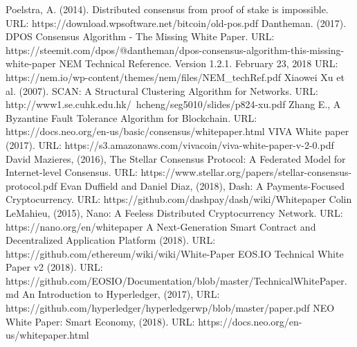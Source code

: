 \documentclass[a4paper,12pt]{article}
\begin{document}
\begin{thebibliography}{99}
  Poelstra, A. (2014). Distributed consensus from proof of stake is impossible. URL: https://download.wpsoftware.net/bitcoin/old-pos.pdf
  Dantheman. (2017). DPOS Consensus Algorithm - The Missing White Paper. URL: https://steemit.com/dpos/@dantheman/dpos-consensus-algorithm-this-missing-white-paper
  NEM Technical Reference. Version 1.2.1. February 23, 2018 URL: https://nem.io/wp-content/themes/nem/files/NEM\_techRef.pdf
 Xiaowei Xu et al. (2007). SCAN: A Structural Clustering Algorithm for Networks. URL: http://www1.se.cuhk.edu.hk/~hcheng/seg5010/slides/p824-xu.pdf
 Zhang E., A Byzantine Fault Tolerance Algorithm for Blockchain. URL: https://docs.neo.org/en-us/basic/consensus/whitepaper.html
 VIVA White paper (2017). URL: https://s3.amazonaws.com/vivacoin/viva-white-paper-v-2-0.pdf
 David Mazieres, (2016), The Stellar Consensus Protocol: A Federated Model for Internet-level Consensus. URL: https://www.stellar.org/papers/stellar-consensus-protocol.pdf
 Evan Duffield and Daniel Diaz, (2018), Dash: A Payments-Focused Cryptocurrency. URL: https://github.com/dashpay/dash/wiki/Whitepaper
 Colin LeMahieu, (2015), Nano: A Feeless Distributed Cryptocurrency Network. URL: https://nano.org/en/whitepaper
 A Next-Generation Smart Contract and Decentralized Application Platform (2018). URL: https://github.com/ethereum/wiki/wiki/White-Paper
 EOS.IO Technical White Paper v2 (2018). URL: https://github.com/EOSIO/Documentation/blob/master/TechnicalWhitePaper.md
 An Introduction to Hyperledger, (2017), URL: https://github.com/hyperledger/hyperledgerwp/blob/master/paper.pdf
 NEO White Paper: Smart Economy, (2018). URL: https://docs.neo.org/en-us/whitepaper.html
\end{thebibliography}
\end{document}
